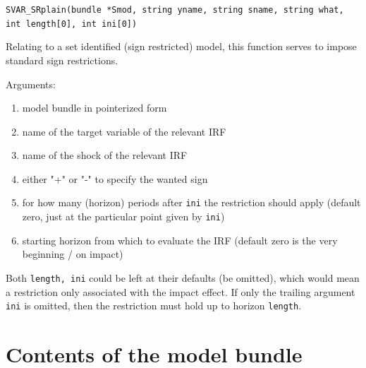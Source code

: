 \documentclass[a4paper,10pt]{article}
\newenvironment{funcdoc}[1]
{\noindent\hrulefill\newline\nopagebreak\texttt{#1}%
\nopagebreak\par\noindent\hrulefill%
\nopagebreak\par\nopagebreak\smallskip\nopagebreak\par}
{\bigskip}
\begin{document}
\begin{funcdoc}{SVAR\_SRplain(bundle *Smod, string yname, string sname, string what, \\
int length[0], int ini[0])}
 Relating to a set identified (sign restricted) model, this function serves to impose standard 
 sign restrictions.
 
 Arguments:
 \begin{enumerate}
 \item model bundle in pointerized form
 \item name of the target variable of the relevant IRF
 \item name of the shock of the relevant IRF
 \item either "+" or "-" to specify the wanted sign
 \item for how many (horizon) periods after \texttt{ini} the restriction should apply (default zero, 
   just at the particular point given by \texttt{ini})
 \item starting horizon from which to evaluate the IRF (default zero is the very beginning / on impact)
 \end{enumerate}
  Both \texttt{length, ini} could be left at their defaults 
  (be omitted), which would mean a restriction only associated with the impact effect. If only the 
  trailing argument \texttt{ini} is omitted, then the restriction must hold up to horizon \texttt{length}.
  \end{funcdoc}



\section{Contents of the model bundle}

\label{sec:bundle_struct}
\end{document}
